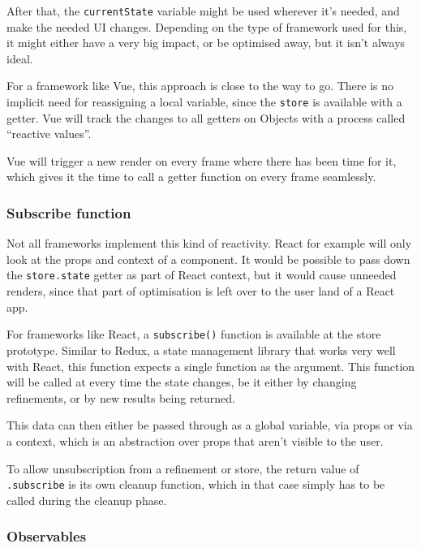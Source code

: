 After that, the {\tt currentState} variable might be used wherever it's needed, and make the needed UI changes. Depending on the type of framework used for this, it might either have a very big impact, or be optimised away, but it isn't always ideal.

For a framework like Vue\cite{vue-reactivity}, this approach is close to the way to go. There is no implicit need for reassigning a local variable, since the {\tt store} is available with a getter. Vue will track the changes to all getters on Objects with a process called ``reactive values''.

Vue will trigger a new render on every frame where there has been time for it, which gives it the time to call a getter function on every frame seamlessly. 

\subsubsection{Subscribe function}
\label{ssub:subscribe_function}

Not all frameworks implement this kind of reactivity. React for example will only look at the \gls{props} and context of a component. It would be possible to pass down the {\tt store.state} getter as part of React context, but it would cause unneeded renders, since that part of optimisation is left over to the user land of a React app. 

For frameworks like React, a {\tt subscribe()} function is available at the store prototype. Similar to Redux\cite{redux-glossary-store}, a state management \gls{library} that works very well with React, this function expects a single function as the argument. This function will be called at every time the state changes, be it either by changing \glspl{refinement}, or by new results being returned.

This data can then either be passed through as a global variable, via props or via a context, which is an abstraction over props that aren't visible to the user.

To allow unsubscription from a refinement or store, the return value of {\tt .subscribe} is its own cleanup function, which in that case simply has to be called during the cleanup phase.

\subsubsection{Observables}
\label{ssub:observables}

